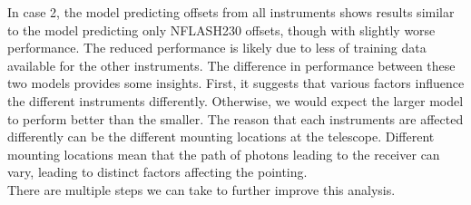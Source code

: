 In case 2, the model predicting offsets from all instruments shows results similar to the model predicting only NFLASH230 offsets, though with slightly worse performance.
The reduced performance is likely due to less of training data available for the other instruments.
The difference in performance between these two models provides some insights.
First, it suggests that various factors influence the different instruments differently.
Otherwise, we would expect the larger model to perform better than the smaller.
The reason that each instruments are affected differently can be the different mounting locations at the telescope.
Different mounting locations mean that the path of photons leading to the receiver can vary, leading to distinct factors affecting the pointing.\\

There are multiple steps we can take to further improve this analysis. 







